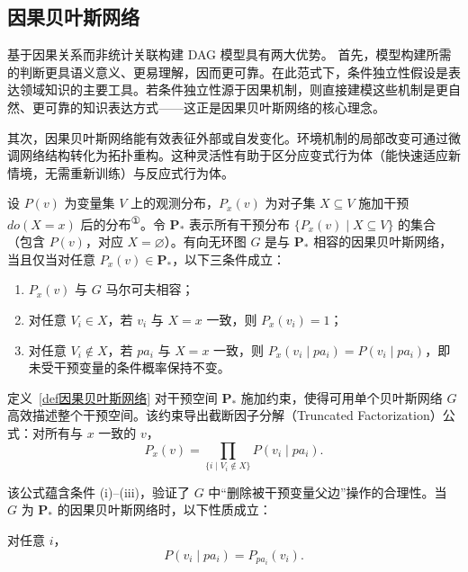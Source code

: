 \subsection{因果贝叶斯网络}

基于因果关系而非统计关联构建 DAG 模型具有两大优势。
首先，模型构建所需的判断更具语义意义、更易理解，因而更可靠。在此范式下，条件独立性假设是表达领域知识的主要工具。若条件独立性源于因果机制，则直接建模这些机制是更自然、更可靠的知识表达方式——这正是因果贝叶斯网络的核心理念。

其次，因果贝叶斯网络能有效表征外部或自发变化。环境机制的局部改变可通过微调网络结构转化为拓扑重构。这种灵活性有助于区分应变式行为体（能快速适应新情境，无需重新训练）与反应式行为体。

\begin{definition}[因果贝叶斯网络]
	\label{def因果贝叶斯网络}
	设 $P(v)$ 为变量集 $V$ 上的观测分布，$P_x(v)$ 为对子集 $X \subseteq V$ 施加干预 $do(X=x)$ 后的分布\textsuperscript{①}。令 $\boldsymbol{P}_*$ 表示所有干预分布 $\{P_x(v) \mid X \subseteq V\}$ 的集合（包含 $P(v)$，对应 $X = \varnothing$）。有向无环图 $G$ 是与 $\boldsymbol{P}_*$ 相容的因果贝叶斯网络，当且仅当对任意 $P_x(v) \in \boldsymbol{P}_*$，以下三条件成立：

	\begin{enumerate}
		\item[(i)] $P_x(v)$ 与 $G$ 马尔可夫相容；
		\item[(ii)] 对任意 $V_i \in X$，若 $v_i$ 与 $X = x$ 一致，则 $P_x(v_i) = 1$；
		\item[(iii)] 对任意 $V_i \notin X$，若 $pa_i$ 与 $X = x$ 一致，则 $P_x(v_i \mid pa_i) = P(v_i \mid pa_i)$，即未受干预变量的条件概率保持不变。
	\end{enumerate}
\end{definition}

定义~\ref{def因果贝叶斯网络} 对干预空间 $\boldsymbol{P}_*$ 施加约束，使得可用单个贝叶斯网络 $G$ 高效描述整个干预空间。该约束导出截断因子分解（Truncated Factorization）公式：对所有与 $x$ 一致的 $v$，
\begin{equation}
	P_x(v) = \prod_{\{i \mid V_i \notin X\}} P(v_i \mid pa_i).
\end{equation}

该公式蕴含条件 (i)–(iii)，验证了 $G$ 中“删除被干预变量父边”操作的合理性。当 $G$ 为 $\boldsymbol{P}_*$ 的因果贝叶斯网络时，以下性质成立：

\begin{proposition}
	\label{性质因果贝叶斯网络1}
	对任意 $i$，
	\begin{equation}
		P(v_i \mid pa_i) = P_{pa_i}(v_i).
	\end{equation}
\end{proposition}

